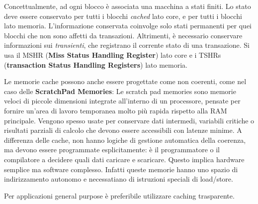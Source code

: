\noindent Concettualmente, ad ogni blocco è associata una macchina a stati finiti. Lo stato deve essere conservato per tutti i blocchi \textit{cached} lato core, e per tutti i blocchi lato memoria. L'informazione conservata coinvolge solo stati permanenti per quei blocchi che non sono affetti da transazioni. Altrimenti, è necessario conservare informazioni sui \textit{transienti}, che registrano il corrente stato di una transazione. Si usa il MSHR (\textbf{Miss Status Handling Register}) lato core e i TSHRs (\textbf{transaction Status Handling Registers}) lato memoria. 

\begin{figure}[ht]
    \centering
    \setlength{\fboxrule}{0.5pt} %
    \setlength{\fboxsep}{0pt}    %
\end{figure}

\begin{info}
    Le memorie cache possono anche essere progettate come non coerenti, come nel caso delle \textbf{ScratchPad Memories}: Le scratch pad memories sono memorie veloci di piccole dimensioni integrate all'interno di un processore, pensate per fornire un'area di lavoro temporanea molto più rapida rispetto alla RAM principale. Vengono spesso usate per conservare dati intermedi, variabili critiche o risultati parziali di calcolo che devono essere accessibili con latenze minime. A differenza delle cache, non hanno logiche di gestione automatica della coerenza, ma devono essere programmate esplicitamente: è il programmatore o il compilatore a decidere quali dati caricare e scaricare. Questo implica hardware semplice ma software complesso. Infatti queste memorie hanno uno spazio di indirizzamento autonomo e necessatiano di istruzioni speciali di load/store.
\end{info}

Per applicazioni general purpose è preferibile utilizzare caching trasparente. 



